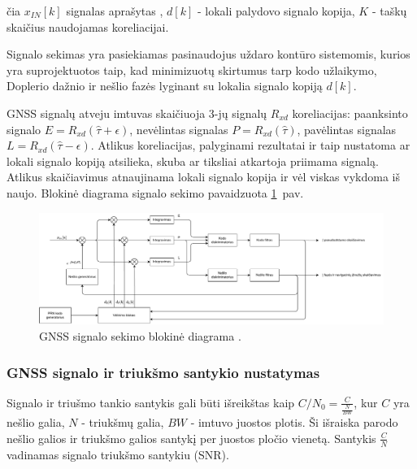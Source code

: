 \documentclass[main.tex]{subfiles}
\begin{document}
\noindent čia $x_{IN}[k]$ signalas aprašytas , $d[k]$ - lokali palydovo
signalo kopija, $K$ - taškų skaičius naudojamas koreliacijai.

Signalo sekimas yra pasiekiamas pasinaudojus uždaro kontūro sistemomis,
kurios yra su\-pro\-jek\-tuo\-tos taip, kad minimizuotų skirtumus tarp kodo užlaikymo,
Doplerio dažnio ir nešlio fazės lyginant su lokalia signalo kopiją $d[k]$.

GNSS signalų atveju imtuvas skaičiuoja 3-jų signalų $R_{xd}$ koreliacijas:
paanksinto signalo $E=R_{xd}(\hat{\tau} + \epsilon)$,
nevėlintas signalas $P=R_{xd}(\hat{\tau})$,
pavėlintas signalas $L=R_{xd}(\hat{\tau} - \epsilon)$.
Atlikus koreliacijas, palyginami rezultatai ir taip nustatoma
ar lokali signalo kopiją atsilieka, skuba ar tiksliai atkartoja
priimama signalą. Atlikus skaičiavimus atnaujinama lokali signalo kopija
ir vėl viskas vykdoma iš naujo. Blokinė diagrama signalo sekimo pavaidzuota
\ref{fig:gnss_sdr_tracking_block}~pav.

\begin{figure}[h]
    \begin{centering}
    \includegraphics[scale=0.5]{drawings/tracking_diagram}
    \par\end{centering}
    \protect\caption{\label{fig:gnss_sdr_tracking_block}GNSS signalo sekimo blokinė diagrama \cite{gnss_sdr_web}.}
\end{figure}

\subsubsection{GNSS signalo ir triukšmo santykio nustatymas}\label{sec:gnss_snr}

Signalo ir triušmo tankio santykis gali būti išreikštas kaip $C/N_0 = \frac{C}{\frac{N}{BW}}$,
kur $C$ yra nešlio galia, $N$ - triukšmų galia, $BW$ - imtuvo juostos plotis.
Ši išraiska parodo nešlio galios ir triukšmo galios santykį per juostos pločio vienetą.
Santykis $\frac{C}{N}$ vadinamas signalo triukšmo santykiu (SNR).
\end{document}
